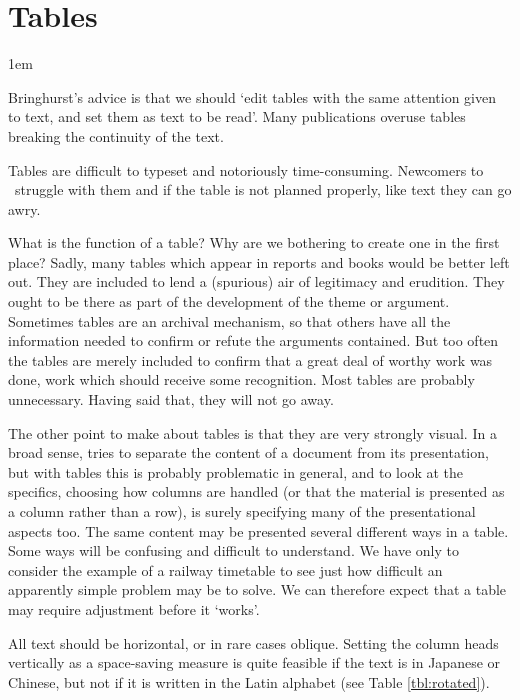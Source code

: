 \chapter{Tables}
\parindent1em
\label{ch:tables}

Bringhurst's \cite{Bringhurst2005} advice is that we should  `edit tables with the same 
attention given to text, and set them as text to be read'. Many publications overuse tables 
breaking the continuity of the text.

Tables are difficult to typeset and notoriously time-consuming. Newcomers to \latex\
struggle with them and if the table is not planned properly, like text they can go awry. 

  What is the function of a table?
Why are we bothering to create one in the first place?
Sadly, many tables which appear in reports and books would
be better left out. They are included to lend a (spurious) air
of legitimacy and erudition. They ought to be there as part
of the development of the theme or argument. Sometimes
tables are an archival mechanism, so that others have all the
information needed to confirm or refute the arguments contained.
But too often the tables are merely included to confirm
that a great deal of worthy work was done, work which
should receive some recognition. Most tables are probably
unnecessary. Having said that, they will not go away.

The other point to make about tables is that they are very
strongly visual. In a broad sense, \latex tries to separate the
content of a document from its presentation, but with tables
this is probably problematic in general, and to look at the
specifics, choosing how columns are handled (or that the material
is presented as a column rather than a row), is surely
specifying many of the presentational aspects too. The same
content may be presented several different ways in a table.
Some ways will be confusing and difficult to understand. We
have only to consider the example of a railway timetable to
see just how difficult an apparently simple problem may be
to solve. We can therefore expect that a table may require
adjustment before it `works'.

All text should be horizontal, or in rare cases oblique. Setting the column heads vertically 
as a space-saving measure is quite feasible if the text is in Japanese or Chinese, 
but not if it is written in the Latin alphabet (see Table \ref{tbl:rotated}).


